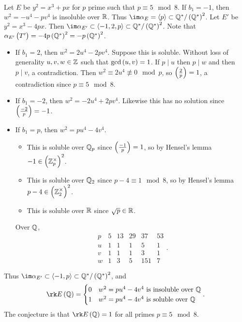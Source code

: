 \begin{example*}
Let $ E $ be $ y^2 = x^3 + px $ for $ p $ prime such that $ p \equiv 5 \mod 8 $. If $ b_1 = -1 $, then $ w^2 = -u^4 - pv^4 $ is insoluble over $ \mathbb{R} $. Thus $ \im \alpha_E = \abr{p} \subset \QQ^* / \br{\QQ^*}^2 $. Let $ E' $ be $ y^2 = x^3 - 4px $. Then $ \im \alpha_{E'} \subset \abr{-1, 2, p} \subset \QQ^* / \br{\QQ^*}^2 $. Note that $ \alpha_{E'}\br{T'} = -4p\br{\QQ^*}^2 = -p\br{\QQ^*}^2 $.
\begin{itemize}
\item If $ b_1 = 2 $, then $ w^2 = 2u^4 - 2pv^4 $. Suppose this is soluble. Without loss of generality $ u, v, w \in \mathbb{Z} $ such that $ \gcd\br{u, v} = 1 $. If $ p \mid u $ then $ p \mid w $ and then $ p \mid v $, a contradiction. Then $ w^2 \equiv 2u^4 \not\equiv 0 \mod p $, so $ \br{\tfrac{2}{p}} = 1 $, a contradiction since $ p \equiv 5 \mod 8 $.
\item If $ b_1 = -2 $, then $ w^2 = -2u^4 + 2pv^4 $. Likewise this has no solution since $ \br{\tfrac{-2}{p}} = -1 $.
\item If $ b_1 = p $, then $ w^2 = pu^4 - 4v^4 $.
\begin{itemize}
\item This is soluble over $ \mathbb{Q}_p $ since $ \br{\tfrac{-1}{p}} = 1 $, so by Hensel's lemma $ -1 \in \br{\ZZ_p^\times}^2 $.
\item This is soluble over $ \mathbb{Q}_2 $ since $ p - 4 \equiv 1 \mod 8 $, so by Hensel's lemma $ p - 4 \in \br{\ZZ_2^\times}^2 $.
\item This is soluble over $ \mathbb{R} $ since $ \sqrt{p} \in \mathbb{R} $.
\end{itemize}
Over $ \mathbb{Q} $,
$$
\begin{array}{c|ccccc}
p & 5 & 13 & 29 & 37 & 53 \\
\hline
u & 1 & 1 & 1 & 5 & 1 \\
v & 1 & 1 & 1 & 3 & 1 \\
w & 1 & 3 & 5 & 151 & 7
\end{array}.
$$
\end{itemize}
Thus $ \im \alpha_{E'} \subset \abr{-1, p} \subset \QQ^* / \br{\QQ^*}^2 $, and
$$ \rk E\br{\QQ} =
\begin{cases}
0 & w^2 = pu^4 - 4v^4 \ \text{is insoluble over} \ \QQ \\
1 & w^2 = pu^4 - 4v^4 \ \text{is soluble over} \ \QQ
\end{cases}.
$$
The conjecture is that $ \rk E\br{\QQ} = 1 $ for all primes $ p \equiv 5 \mod 8 $.
\end{example*}

